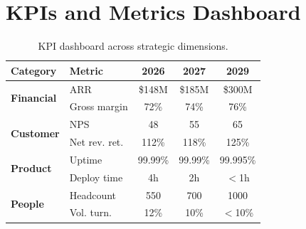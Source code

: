 \documentclass[
    language=english,
    doctype=strategic-plan,
    institution=none,
]{../../omnilatex}
\begin{document}
\section{KPIs and Metrics Dashboard}
\begin{table}[htbp]
\centering\small
\begin{tabular}{llccc}
    \toprule
    \textbf{Category} & \textbf{Metric} & \textbf{2026} & \textbf{2027} & \textbf{2029} \\
    \midrule
    \multirow{2}{*}{\textbf{Financial}}
        & ARR           & \$148M & \$185M & \$300M \\
        & Gross margin  & 72\%   & 74\%   & 76\%   \\
    \midrule
    \multirow{2}{*}{\textbf{Customer}}
        & NPS           & 48     & 55     & 65     \\
        & Net rev. ret. & 112\%  & 118\%  & 125\%  \\
    \midrule
    \multirow{2}{*}{\textbf{Product}}
        & Uptime        & 99.99\%& 99.99\%& 99.995\% \\
        & Deploy time   & 4h     & 2h     & $<$1h    \\
    \midrule
    \multirow{2}{*}{\textbf{People}}
        & Headcount     & 550    & 700    & 1000     \\
        & Vol. turn.    & 12\%   & 10\%   & $<$10\%  \\
    \bottomrule
\end{tabular}
\caption{KPI dashboard across strategic dimensions.}
\end{table}
\end{document}
